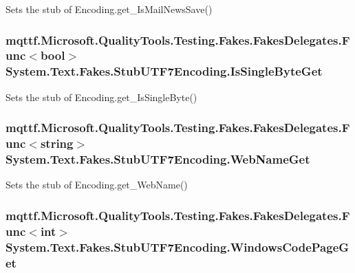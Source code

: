 Sets the stub of Encoding.\-get\-\_\-\-Is\-Mail\-News\-Save()

\hypertarget{class_system_1_1_text_1_1_fakes_1_1_stub_u_t_f7_encoding_af1d52ee99de2a49c1eff7078f7c14f82}{
\subsubsection[{Is\-Single\-Byte\-Get}]{\setlength{\rightskip}{0pt plus 5cm}mqttf.\-Microsoft.\-Quality\-Tools.\-Testing.\-Fakes.\-Fakes\-Delegates.\-Func$<$bool$>$ System.\-Text.\-Fakes.\-Stub\-U\-T\-F7\-Encoding.\-Is\-Single\-Byte\-Get}}\label{class_system_1_1_text_1_1_fakes_1_1_stub_u_t_f7_encoding_af1d52ee99de2a49c1eff7078f7c14f82}


Sets the stub of Encoding.\-get\-\_\-\-Is\-Single\-Byte()

\hypertarget{class_system_1_1_text_1_1_fakes_1_1_stub_u_t_f7_encoding_a6877ba5f4333f07d0d1dd089867609d1}{
\subsubsection[{Web\-Name\-Get}]{\setlength{\rightskip}{0pt plus 5cm}mqttf.\-Microsoft.\-Quality\-Tools.\-Testing.\-Fakes.\-Fakes\-Delegates.\-Func$<$string$>$ System.\-Text.\-Fakes.\-Stub\-U\-T\-F7\-Encoding.\-Web\-Name\-Get}}\label{class_system_1_1_text_1_1_fakes_1_1_stub_u_t_f7_encoding_a6877ba5f4333f07d0d1dd089867609d1}


Sets the stub of Encoding.\-get\-\_\-\-Web\-Name()

\hypertarget{class_system_1_1_text_1_1_fakes_1_1_stub_u_t_f7_encoding_a77b89b0399dd9dd928f01078b4718202}{
\subsubsection[{Windows\-Code\-Page\-Get}]{\setlength{\rightskip}{0pt plus 5cm}mqttf.\-Microsoft.\-Quality\-Tools.\-Testing.\-Fakes.\-Fakes\-Delegates.\-Func$<$int$>$ System.\-Text.\-Fakes.\-Stub\-U\-T\-F7\-Encoding.\-Windows\-Code\-Page\-Get}}\label{class_system_1_1_text_1_1_fakes_1_1_stub_u_t_f7_encoding_a77b89b0399dd9dd928f01078b4718202}


